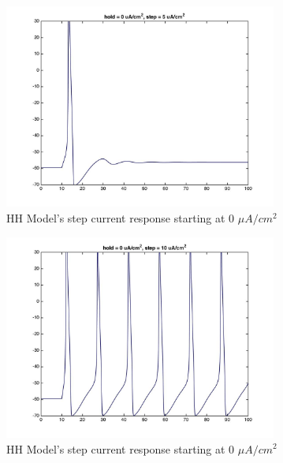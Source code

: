 \documentclass{beamer}
\begin{document}
\begin{frame}
  \begin{figure}
    \centering
    \includegraphics[width = 0.8\textwidth]{./images/current_0_5.jpg}
    \caption{HH Model's step current response starting at 0 $\mu A/cm^2$}
  \end{figure}
\end{frame}


\begin{frame}
  \begin{figure}
    \centering
    \includegraphics[width = 0.8\textwidth]{./images/current_0_10.jpg}
    \caption{HH Model's step current response starting at 0 $\mu A/cm^2$}
  \end{figure}
\end{frame}
\end{document}
